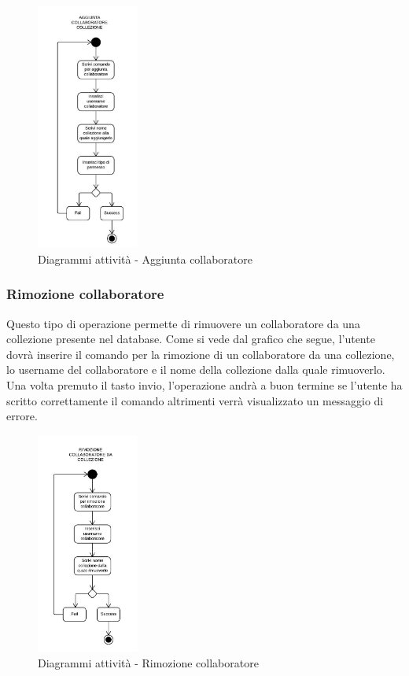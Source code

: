 \documentclass{scalatekids-article}
\begin{document}
\begin{figure}[H]
  \begin{center}
    \includegraphics[width=0.3\textwidth, keepaspectratio]{img/diagrammiAttivita/aggCollaboratore.jpeg}
    \caption{Diagrammi attività - Aggiunta collaboratore}
  \end{center}
\end{figure}

\subsubsection{Rimozione collaboratore}

Questo tipo di operazione permette di rimuovere un collaboratore da una
collezione presente nel database. Come si vede dal grafico che segue, l'utente
dovrà inserire il comando per la rimozione di un collaboratore da una
collezione, lo username del collaboratore e il nome della collezione dalla
quale rimuoverlo. Una volta premuto il tasto invio, l'operazione andrà a buon
termine se l'utente ha scritto correttamente il comando altrimenti verrà
visualizzato un messaggio di errore.

\begin{figure}[H]
  \begin{center}
    \includegraphics[width=0.3\textwidth, keepaspectratio]{img/diagrammiAttivita/rimozioneCollaboratore.jpeg}
    \caption{Diagrammi attività - Rimozione collaboratore}
  \end{center}
\end{figure}
\end{document}
